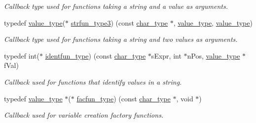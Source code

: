 \begin{DoxyCompactItemize}
\begin{DoxyCompactList}\small\item\em Callback type used for functions taking a string and a value as arguments. \end{DoxyCompactList}\item 
typedef \hyperlink{namespacemu_a17d4f113a4b88b8d971cca8ddbbe8a47}{value\+\_\+type}($\ast$ \hyperlink{namespacemu_a1ce7a16b2a2b87f662819b7ee1d87bc0}{strfun\+\_\+type3}) (const \hyperlink{namespacemu_a81cc89a81a8872430ab1799b5848c5ca}{char\+\_\+type} $\ast$, \hyperlink{namespacemu_a17d4f113a4b88b8d971cca8ddbbe8a47}{value\+\_\+type}, \hyperlink{namespacemu_a17d4f113a4b88b8d971cca8ddbbe8a47}{value\+\_\+type})
\begin{DoxyCompactList}\small\item\em Callback type used for functions taking a string and two values as arguments. \end{DoxyCompactList}\item 
typedef int($\ast$ \hyperlink{namespacemu_a0e40974644c0e6488d76229ca0f4ce23}{identfun\+\_\+type}) (const \hyperlink{namespacemu_a81cc89a81a8872430ab1799b5848c5ca}{char\+\_\+type} $\ast$s\+Expr, int $\ast$n\+Pos, \hyperlink{namespacemu_a17d4f113a4b88b8d971cca8ddbbe8a47}{value\+\_\+type} $\ast$f\+Val)
\begin{DoxyCompactList}\small\item\em Callback used for functions that identify values in a string. \end{DoxyCompactList}\item 
typedef \hyperlink{namespacemu_a17d4f113a4b88b8d971cca8ddbbe8a47}{value\+\_\+type} $\ast$($\ast$ \hyperlink{namespacemu_a97af5f5c39391d262dda72084788b83e}{facfun\+\_\+type}) (const \hyperlink{namespacemu_a81cc89a81a8872430ab1799b5848c5ca}{char\+\_\+type} $\ast$, void $\ast$)
\begin{DoxyCompactList}\small\item\em Callback used for variable creation factory functions. \end{DoxyCompactList}\end{DoxyCompactItemize}
